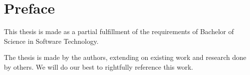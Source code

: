 \chapter{Preface}
This thesis is made as a partial fulfillment of the requirements of
Bachelor of Science in Software Technology. 

The thesis is made by the authors, extending on existing work and
research done by others. We will do our best to rightfully reference
this work.

